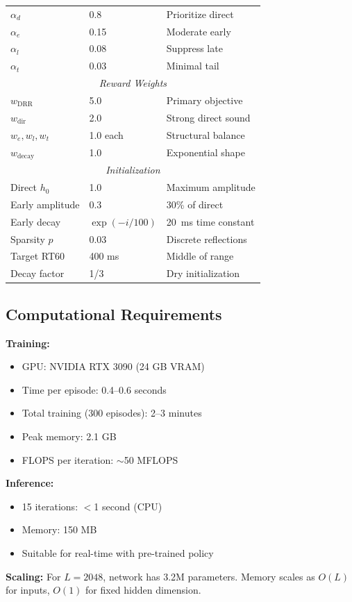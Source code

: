 \documentclass[12pt,a4paper]{article}
\begin{document}
\begin{table}[h]
\begin{tabular}{@{}lll@{}}
\midrule
$\alpha_d$ & 0.8 & Prioritize direct \\
$\alpha_e$ & 0.15 & Moderate early \\
$\alpha_l$ & 0.08 & Suppress late \\
$\alpha_t$ & 0.03 & Minimal tail \\
\midrule
\multicolumn{3}{c}{\textit{Reward Weights}} \\
\midrule
$w_{\text{DRR}}$ & 5.0 & Primary objective \\
$w_{\text{dir}}$ & 2.0 & Strong direct sound \\
$w_e, w_l, w_t$ & 1.0 each & Structural balance \\
$w_{\text{decay}}$ & 1.0 & Exponential shape \\
\midrule
\multicolumn{3}{c}{\textit{Initialization}} \\
\midrule
Direct $h_0$ & 1.0 & Maximum amplitude \\
Early amplitude & 0.3 & 30\% of direct \\
Early decay & $\exp(-i/100)$ & 20~ms time constant \\
Sparsity $p$ & 0.03 & Discrete reflections \\
Target RT60 & 400 ms & Middle of range \\
Decay factor & 1/3 & Dry initialization \\
\bottomrule
\end{tabular}
\end{table}

\subsection{Computational Requirements}

\textbf{Training:} 
\begin{itemize}
\item GPU: NVIDIA RTX 3090 (24 GB VRAM)
\item Time per episode: 0.4--0.6 seconds
\item Total training (300 episodes): 2--3 minutes
\item Peak memory: 2.1 GB
\item FLOPS per iteration: $\sim$50 MFLOPS
\end{itemize}

\textbf{Inference:}
\begin{itemize}
\item 15 iterations: $<$1 second (CPU)
\item Memory: 150 MB
\item Suitable for real-time with pre-trained policy
\end{itemize}

\textbf{Scaling:} For $L=2048$, network has 3.2M parameters. Memory scales as $O(L)$ for inputs, $O(1)$ for fixed hidden dimension.



\end{document}
